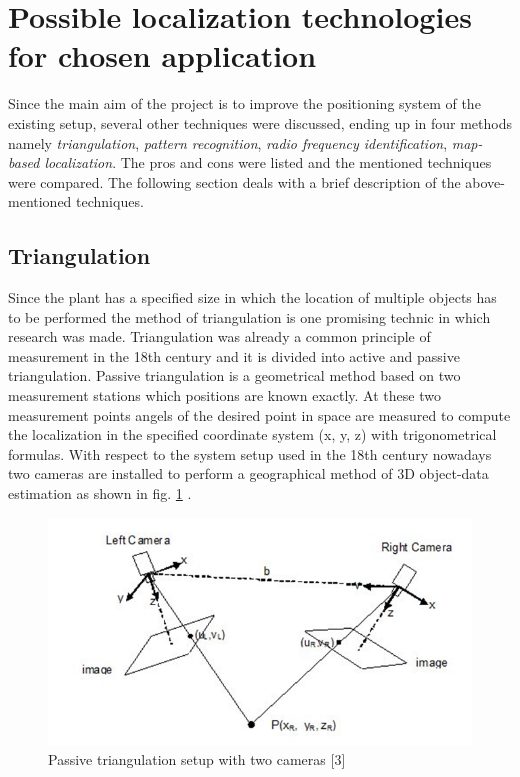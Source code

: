 \section{Possible localization technologies for chosen application} \label{Sec_selectionp}

Since the main aim of the project is to improve the positioning system of the existing setup, several other techniques were discussed, ending up in four methods namely \textit{triangulation}, \textit{pattern recognition}, \textit{radio frequency identification}, \textit{map-based localization}. The pros and cons were listed and the mentioned techniques were compared. The following section deals with a brief description of the above-mentioned techniques.\\

\subsection{Triangulation} %
Since the plant has a specified size in which the location of multiple objects has to be performed the method of triangulation is one promising technic in which research was made. 
Triangulation was already a common principle of measurement in the 18th century and it is divided into active and passive triangulation. Passive triangulation is a geometrical method based on two measurement stations which positions are known exactly. At these two measurement points angels of the desired point in space are measured to compute the localization in the specified coordinate system (x, y, z) with trigonometrical formulas.
With respect to the system setup used in the 18th century nowadays two cameras are installed to perform a geographical method of 3D object-data estimation as shown in fig. \ref{Triangulation} \cite{Prinzip3DVideometrie.}.
\begin{figure}[!htbp]
\centering
\includegraphics[width = 16cm]{Pictures/Triangulation}
\caption{Passive triangulation setup with two cameras [3]}
\label{Triangulation}
\end{figure}\\

